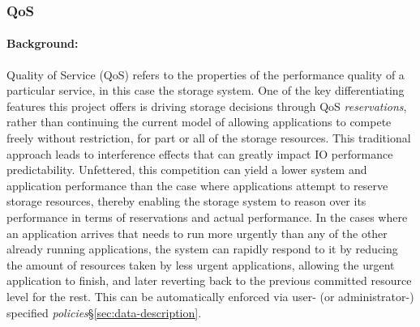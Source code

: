 \subsubsection{QoS}
\paragraph{Background:} Quality of Service (QoS) refers to the
properties of the performance quality of a particular service, in
this case the storage system.
One of the key differentiating features this project offers is driving storage
decisions through QoS \emph{reservations}, rather than continuing the current model
of allowing applications to compete freely without restriction, for part or all of the storage
resources. This traditional approach leads to interference effects
\cite{lofstead:2010:io-variability,liu_hotstorage} that can greatly impact IO performance predictability. 
Unfettered, this competition can yield a lower system and application performance 
than the case where applications attempt to reserve storage resources, thereby enabling the storage system
to reason over its performance in terms of reservations and actual
performance.
In the cases where an application arrives that needs to run more urgently
than any of the other already running applications, the system
can rapidly respond to it by reducing the amount of resources taken 
by less urgent applications, allowing the urgent application to finish,
and later reverting back to the previous committed resource level for the rest.
This can be automatically enforced via user- (or administrator-) specified \textit{policies}\S\ref{sec:data-description}.

